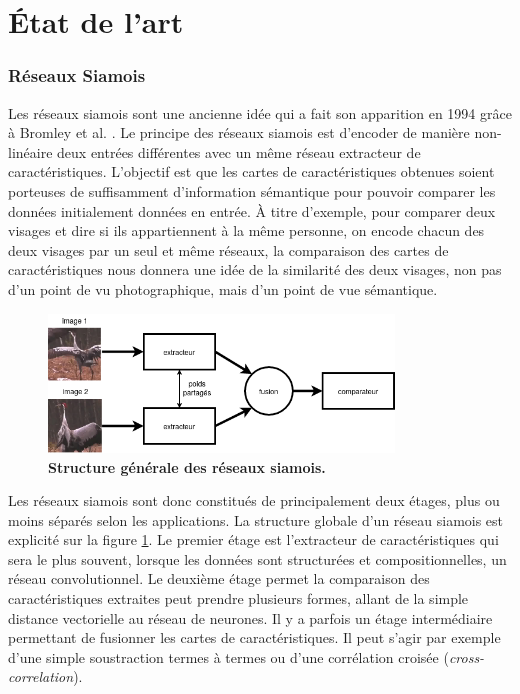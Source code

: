 \documentclass[10pt,twocolumn,letterpaper,french]{article}
\begin{document}
\section*{État de l'art}

\subsubsection*{Réseaux Siamois}

Les réseaux siamois sont une ancienne idée qui a fait son apparition en 1994 grâce à Bromley et al. \cite{siamese}. Le principe des réseaux siamois est d'encoder de manière non-linéaire deux entrées différentes avec un même réseau extracteur de caractéristiques. L'objectif est que les cartes de caractéristiques obtenues soient porteuses de suffisamment d'information sémantique pour pouvoir comparer les données initialement données en entrée. À titre d'exemple, pour comparer deux visages et dire si ils appartiennent à la même personne, on encode chacun des deux visages par un seul et même réseaux, la comparaison des cartes de caractéristiques nous donnera une idée de la similarité des deux visages, non pas d'un point de vu photographique, mais d'un point de vue sémantique. \\

\begin{figure}[!h]
\centering
\includegraphics[width=260pt]{images/principe/siamese.png}
\caption{\textbf{Structure générale des réseaux siamois.}}
\label{siamese}
\end{figure}

Les réseaux siamois sont donc constitués de principalement deux étages, plus ou moins séparés selon les applications. La structure globale d'un réseau siamois est explicité sur la figure \ref{siamese}. Le premier étage est l'extracteur de caractéristiques qui sera le plus souvent, lorsque les données sont structurées et compositionnelles, un réseau convolutionnel. Le deuxième étage permet la comparaison des caractéristiques extraites peut prendre plusieurs formes, allant de la simple distance vectorielle au réseau de neurones. Il y a parfois un étage intermédiaire permettant de fusionner les cartes de caractéristiques. Il peut s'agir par exemple d'une simple soustraction termes à termes ou d'une corrélation croisée (\textit{cross-correlation}).\\
\end{document}
